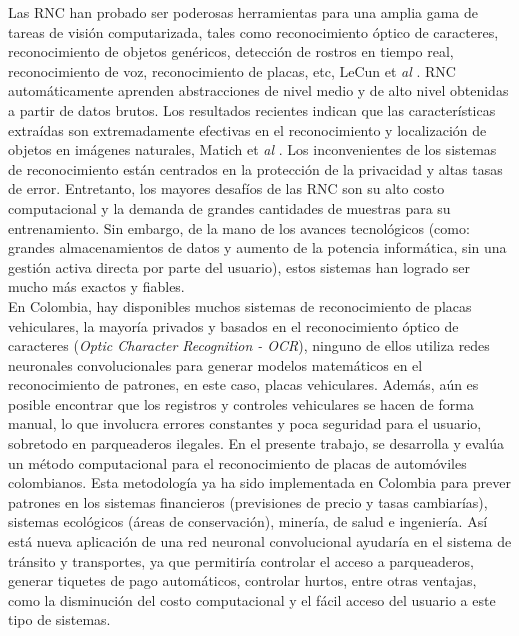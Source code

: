 Las RNC han probado ser poderosas herramientas para una amplia gama de tareas de visión computarizada, tales como reconocimiento óptico de caracteres, reconocimiento de objetos genéricos, detección de rostros en tiempo real, reconocimiento de voz, reconocimiento de placas, etc, LeCun et \textit{al} \cite{Lecun2015}. RNC automáticamente aprenden abstracciones de nivel medio y de alto nivel obtenidas a partir de datos brutos. Los resultados recientes indican que las características extraídas son extremadamente efectivas en el reconocimiento y localización de objetos en imágenes naturales, Matich et \textit{al} \cite{matich2001redes}. Los inconvenientes de los sistemas de reconocimiento están centrados en la protección de la privacidad y altas tasas de error. Entretanto, los mayores desafíos de las RNC son su alto costo computacional y la demanda de grandes cantidades de muestras para su entrenamiento. Sin embargo, de la mano de los avances tecnológicos (como: grandes almacenamientos de datos y aumento de la potencia informática, sin una gestión activa directa por parte del usuario), estos sistemas han logrado ser mucho más exactos y fiables.\\

En Colombia, hay disponibles muchos sistemas de reconocimiento de placas vehiculares, la mayoría privados y basados en el reconocimiento óptico de caracteres (\textit{Optic Character Recognition - OCR}), ninguno de ellos utiliza redes neuronales convolucionales para generar modelos matemáticos en el reconocimiento de patrones, en este caso, placas vehiculares. Además, aún es posible encontrar que los registros y controles vehiculares se hacen de forma manual, lo que involucra errores constantes y poca seguridad para el usuario, sobretodo en parqueaderos ilegales. En el presente trabajo, se desarrolla y evalúa un método computacional para el reconocimiento de placas de automóviles colombianos. Esta metodología ya ha sido implementada en Colombia para prever patrones en los sistemas financieros (previsiones de precio y tasas cambiarías), sistemas ecológicos (áreas de conservación), minería, de salud e ingeniería. Así está nueva aplicación de una red neuronal convolucional ayudaría en el sistema de tránsito y transportes, ya que permitiría controlar el acceso a parqueaderos, generar tiquetes de pago automáticos, controlar hurtos, entre otras ventajas, como la disminución del costo computacional y el fácil acceso del usuario a este tipo de sistemas.
